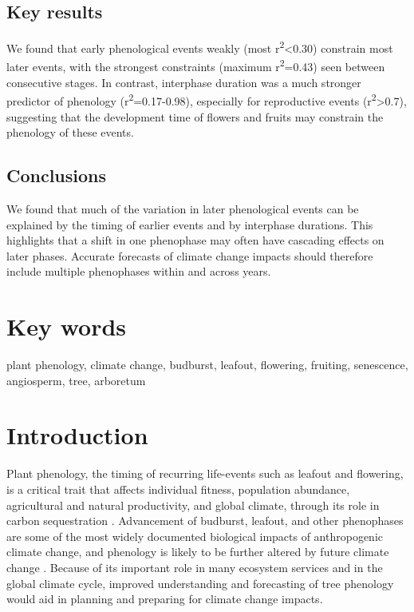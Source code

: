 \documentclass{article}
\begin{document}
\subsection*{Key results}
We found that early phenological events weakly (most r\textsuperscript{2}<0.30) constrain most later events, with the strongest constraints (maximum r\textsuperscript{2}=0.43) seen between consecutive stages. In contrast, interphase duration was a much stronger predictor of phenology (r\textsuperscript{2}=0.17-0.98), especially for reproductive events (r\textsuperscript{2}>0.7), suggesting that the development time of flowers and fruits may constrain the phenology of these events.
\subsection*{Conclusions}
We found that much of the variation in later phenological events can be explained by the timing of earlier events and by interphase durations. This highlights that a shift in one phenophase may often have cascading effects on later phases. Accurate forecasts of climate change impacts should therefore include multiple phenophases within and across years. %

\section* {Key words}
plant phenology, climate change, budburst, leafout, flowering, fruiting, senescence, angiosperm, tree, arboretum
\section* {Introduction}
Plant phenology, the timing of recurring life-events such as leafout and flowering, is a critical trait that affects individual fitness, population abundance, agricultural and natural productivity, and global climate, through its role in carbon sequestration \citep{chuine2001,cleland2007,willis2010,miller-rushing2010,craine2012}. Advancement of budburst, leafout, and other phenophases are some of the most widely documented biological impacts of anthropogenic climate change, and phenology is likely to be further altered by future climate change \citep{parmesan2006}. Because of its important role in many ecosystem services and in the global climate cycle, improved understanding and forecasting of tree phenology would aid in planning and preparing for climate change impacts.
\end{document}
